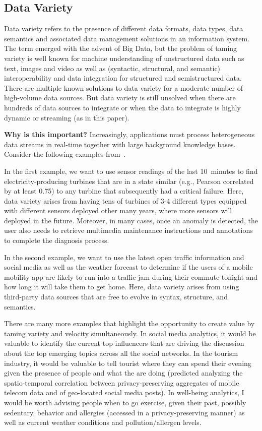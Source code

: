 \subsection{Data Variety}

Data variety refers to the presence of different data formats, data
types, data semantics and associated data management solutions in an
information system. The term emerged with the advent of Big Data, but
the problem of taming variety is well known for machine understanding
of unstructured data such as text, images and video as well as
(syntactic, structural, and semantic) interoperability and data
integration for structured and semistructured data.  There are
multiple known solutions to data variety for a moderate number of
high-volume data sources.  But data variety is still unsolved when
there are hundreds of data sources to integrate or when the data to
integrate is highly dynamic or streaming (as in this paper).

\textbf{Why is this important?}
%
Increasingly, applications must process heterogeneous data streams in
real-time together with large background knowledge bases. Consider the
following examples from~\cite{DellAglioDataScience2017}.

In the first example, we want to use sensor readings of the last
10~minutes to find electricity-producing turbines that are in a state
similar (e.g., Pearson correlated by at least 0.75) to any turbine
that subsequently had a critical failure. Here, data variety arises
from having tens of turbines of 3-4 different types equipped with
different sensors deployed other many years, where more sensors will
deployed in the future. Moreover, in many cases, once an anomaly is
detected, the user also needs to retrieve multimedia maintenance
instructions and annotations to complete the diagnosis process.

In the second example, we want to use the latest open traffic
information and social media as well as the weather forecast to
determine if the users of a mobile mobility app are likely to run into
a traffic jam during their commute tonight and how long it will take
them to get home. Here, data variety arises from using third-party
data sources that are free to evolve in syntax, structure, and
semantics.

There are many more examples that highlight the opportunity to create
value by taming variety and velocity simultaneously. In social media
analytics, it would be valuable to identify the current top
influencers that are driving the discussion about the top emerging
topics across all the social networks. In the tourism industry, it
would be valuable to tell tourist where they can spend their evening
given the presence of people and what the are doing (predicted
analyzing the spatio-temporal correlation between privacy-preserving
aggregates of mobile telecom data and of geo-located social media
posts). In well-being analytics, I would be worth advising people when
to go exercise, given their past, possibly sedentary, behavior and
allergies (accessed in a privacy-preserving manner) as well as current
weather conditions and pollution/allergen levels.


